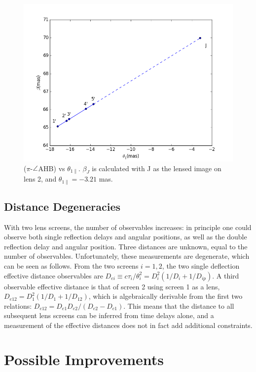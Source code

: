 \documentclass[useAMS,usenatbib]{mn2e}
\begin{document}
\begin{figure}
\centering
\includegraphics[width=1.0\linewidth]{Reflection_angle.png}
\caption{  ($\pi$-$\protect\angle$AHB) vs $\theta_{1\parallel}$.
$\beta_J$ is calculated with J as the lensed image on lens 2, and $\theta_{1\parallel}=-3.21$ mas.}
\label{vtrans}
\end{figure}

\subsection{Distance Degeneracies}

With two lens screens, the number of observables increases: in
principle one could observe both single reflection delays and angular
positions, as well as the double reflection delay and angular
position.  Three distances are unknown, equal to the number of
observables.  Unfortunately, these measurements are degenerate, which
can be seen as follows. From the two screens $i=1,2$, the two single
deflection effective distance observables are
$D_{ei} \equiv c\tau_i/\theta_i^2=D_i^2(1/D_i+1/D_{ip})$.  A third
observable effective distance is that of screen 2 using screen 1 as a
lens, $D_{e12}=D_1^2(1/D_1+1/D_{12})$, which is algebraically
derivable from the first two relations:
$D_{e12}=D_{e1}D_{e2}/(D_{e2}-D_{e1})$.  This means that the distance
to all subsequent lens screens can be inferred from time delays alone,
and a measurement of the effective distances does not in fact add
additional constraints.

\section{Possible Improvements}
\end{document}
